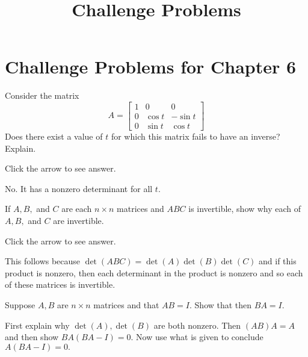 \documentclass{ximera}
\title{Challenge Problems} \license{CC BY-NC-SA 4.0}
\begin{document}
\begin{abstract}
\end{abstract}
\maketitle

\section*{Challenge Problems for Chapter 6}

\begin{problem}\label{prb:7.32} Consider the matrix
\begin{equation*}
A =
\left[
\begin{array}{ccc}
1 & 0 & 0 \\
0 & \cos t & -\sin t \\
0 & \sin t & \cos t
\end{array}
\right]
\end{equation*}
Does there exist a value of $t$ for which this matrix fails to have an
inverse? Explain.

Click the arrow to see answer.
\begin{expandable}
 No. It has a nonzero determinant for all $t$.
\end{expandable}
\end{problem}

\begin{problem}\label{prb:7.41} If $A,B,$ and $C$ are each $n\times n$ matrices and $ABC$ is
invertible, show why each of $A,B,$ and $C$ are invertible.

Click the arrow to see answer.

\begin{expandable}
This follows
because $\det \left( ABC\right) =\det \left( A\right) \det \left( B\right)
\det \left( C\right) $ and if this product is nonzero, then each determinant
in the product is nonzero and so each of these matrices is invertible.
\end{expandable}
\end{problem}

\begin{problem}\label{prb:7.37} Suppose $A,B$ are $n\times n$ matrices and that $AB=I.$ Show that then
$BA=I.$ 
\begin{hint}
First explain why
$\det \left( A\right) ,\det \left( B\right) $ are both nonzero. Then $\left(
AB\right) A=A$ and then show $BA\left( BA-I\right) =0.$ Now use what
is given to conclude $A\left( BA-I\right) =0.$ 
\end{hint}
\end{problem}
\end{document}

